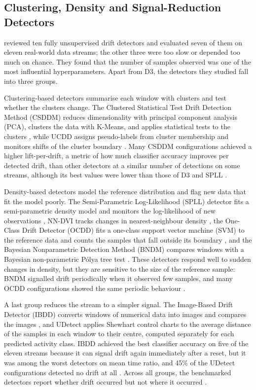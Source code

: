 \subsection{Clustering, Density and Signal-Reduction Detectors}
\citet{Lukats2024} reviewed ten fully unsupervised drift detectors and evaluated seven of them on eleven real-world data streams; the other three were too slow or depended too much on chance. They found that the number of samples observed was one of the most influential hyperparameters. Apart from D3, the detectors they studied fall into three groups.

Clustering-based detectors summarise each window with clusters and test whether the clusters change. The Clustered Statistical Test Drift Detection Method (CSDDM) reduces dimensionality with principal component analysis (PCA), clusters the data with K-Means, and applies statistical tests to the clusters \citep{CSDDM2021}, while UCDD assigns pseudo-labels from cluster membership and monitors shifts of the cluster boundary \citep{UCDD2020}. Many CSDDM configurations achieved a higher lift-per-drift, a metric of how much classifier accuracy improves per detected drift, than other detectors at a similar number of detections on some streams, although its best values were lower than those of D3 and SPLL \citep{Lukats2024}.

Density-based detectors model the reference distribution and flag new data that fit the model poorly. The Semi-Parametric Log-Likelihood (SPLL) detector fits a semi-parametric density model and monitors the log-likelihood of new observations \citep{SPLL2013}, NN-DVI tracks changes in nearest-neighbour density \citep{NNDVI2018}, the One-Class Drift Detector (OCDD) fits a one-class support vector machine (SVM) to the reference data and counts the samples that fall outside its boundary \citep{OCDD2021}, and the Bayesian Nonparametric Detection Method (BNDM) compares windows with a Bayesian non-parametric P\'{o}lya tree test \citep{BNDM2020}. These detectors respond well to sudden changes in density, but they are sensitive to the size of the reference sample: BNDM signalled drift periodically when it observed few samples, and many OCDD configurations showed the same periodic behaviour \citep{Lukats2024}.

A last group reduces the stream to a simpler signal. The Image-Based Drift Detector (IBDD) converts windows of numerical data into images and compares the images \citep{IBDD2021}, and UDetect \citep{Bashir2017} applies Shewhart control charts to the average distance of the samples in each window to their centre, computed separately for each predicted activity class. IBDD achieved the best classifier accuracy on five of the eleven streams because it can signal drift again immediately after a reset, but it was among the worst detectors on mean time ratio, and 45\% of the UDetect configurations detected no drift at all \citep{Lukats2024}. Across all groups, the benchmarked detectors report whether drift occurred but not where it occurred \citep{Lukats2024}.

